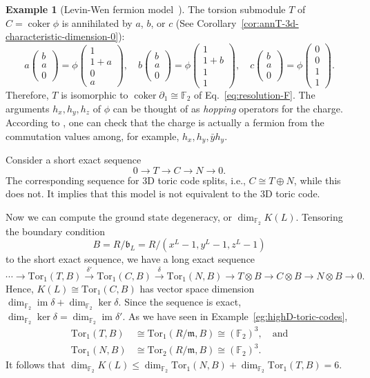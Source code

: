 \documentclass[letterpaper,12pt]{amsart}
\theoremstyle{definition} \newtheorem{defn}{Definition}
\theoremstyle{definition} \newtheorem{rem}{Remark}
\theoremstyle{definition} \newtheorem{example}{Example}
\newcommand{\im}{\mathop{\mathrm{im}}}
\newcommand{\coker}{\mathop{\mathrm{coker}}}
\newcommand{\Tor}{{\mathrm{Tor}}}
\newcommand{\FF}{\mathbb{F}}
\newcommand{\mm}{\mathfrak{m}}
\newcommand{\bb}{\mathfrak{b}}
\begin{document}
\begin{example}[Levin-Wen fermion model~\cite{LevinWen2003Fermions}]
The torsion submodule $T$ of $C = \coker \phi$ is annihilated by $a$, $b$, or $c$
(See Corollary~\ref{cor:annT-3d-characteristic-dimension-0}):
\[
 a \begin{pmatrix} b \\ a \\ 0 \end{pmatrix} =\phi \begin{pmatrix} 1 \\ 1+a \\ 0 \\ a \end{pmatrix}, \quad
 b \begin{pmatrix} b \\ a \\ 0 \end{pmatrix} =\phi \begin{pmatrix} 1 \\ 1+b \\ 1 \\ 1 \end{pmatrix}, \quad
 c \begin{pmatrix} b \\ a \\ 0 \end{pmatrix} =\phi \begin{pmatrix} 0 \\ 0 \\ 1 \\ 1 \end{pmatrix}.
\]
Therefore, $T$ is isomorphic to $\coker \partial_1 \cong \FF_2$ of Eq.~\eqref{eq:resolution-F}.
The arguments $h_x,h_y,h_z$ of $\phi$ can be thought of as \emph{hopping} operators for the charge.
According to \cite{LevinWen2003Fermions}, one can check that the charge is actually a fermion
from the commutation values among, for example, $h_x,h_y,\bar y h_y$.


Consider a short exact sequence
\[
 0 \to T \to C \to N \to 0 .
\]
The corresponding sequence for 3D toric code splits,
i.e., $C \cong T \oplus N$, while this does not.
It implies that this model is not equivalent to the 3D toric code.

Now we can compute the ground state degeneracy, or $\dim_{\FF_2} K(L)$.
Tensoring the boundary condition
\[
B = R/\bb_L = R/(x^L-1,y^L-1,z^L-1)
\]
to the short exact sequence,
we have a long exact sequence
\[
 \cdots \to
\Tor_1(T,B) \xrightarrow{\delta'} \Tor_1( C, B) \xrightarrow{\delta} \Tor_1(N,B) 
\to T \otimes B \to C \otimes B \to N \otimes B \to 0 .
\]
Hence, $K(L) \cong \Tor_1( C,B)$ has vector space dimension $\dim_{\FF_2} \im \delta + \dim_{\FF_2} \ker \delta$.
Since the sequence is exact, $\dim_{\FF_2} \ker \delta = \dim_{\FF_2} \im \delta'$.
As we have seen in Example~\ref{eg:highD-toric-codes},
\begin{align*}
 \Tor_1(T,B) & \cong \Tor_1(R/\mm,B) \cong (\FF_2)^3 , \quad \text{and} \\
 \Tor_1(N,B) & \cong \Tor_2(R/\mm,B) \cong (\FF_2)^3 .
\end{align*}
It follows that $\dim_{\FF_2} K(L) \le \dim_{\FF_2} \Tor_1(N,B) + \dim_{\FF_2} \Tor_1(T,B) = 6$.


\end{example}
\end{document}
